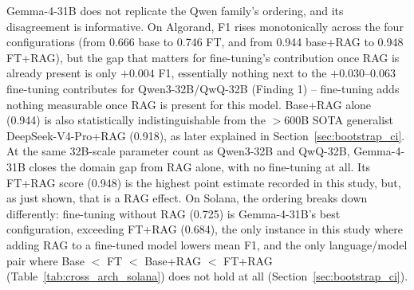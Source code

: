 \documentclass[lettersize,journal]{IEEEtran}
\begin{document}
\begin{table}[t]
\centering
\small
\caption{Solana, Gemma-4-31B and Qwen3-Coder-30B-A3B performance.}
\label{tab:cross_arch_solana}
\end{table}

Gemma-4-31B does not replicate the Qwen family's ordering, and its disagreement is
informative. On Algorand, F1 rises monotonically across the four configurations (from 0.666 base
to 0.746 FT, and from 0.944 base+RAG to 0.948 FT+RAG), but the gap that
matters for fine-tuning's contribution once RAG is already present is only $+0.004$
F1, essentially nothing next to the $+0.030$--$0.063$ fine-tuning contributes for Qwen3-32B/QwQ-32B
(Finding 1) -- fine-tuning adds nothing measurable once RAG is present for this model. Base+RAG
alone (0.944) is also statistically indistinguishable from the $>$600B SOTA generalist
DeepSeek-V4-Pro+RAG (0.918), as later explained in Section~\ref{sec:bootstrap_ci}. At the same 32B-scale
parameter count as Qwen3-32B and QwQ-32B, Gemma-4-31B closes the domain gap from RAG alone, with no
fine-tuning at all. Its FT+RAG score (0.948) is the highest point estimate recorded in
this study, but, as just shown, that is a RAG effect. On Solana, the ordering breaks down
differently: fine-tuning without RAG (0.725) is Gemma-4-31B's best configuration,
exceeding FT+RAG (0.684), the only instance in this study where adding RAG to a
fine-tuned model lowers mean F1, and the only language/model pair where Base $<$ FT $<$ Base+RAG $<$
FT+RAG (Table~\ref{tab:cross_arch_solana}) does not hold at all (Section~\ref{sec:bootstrap_ci}).
\end{document}
